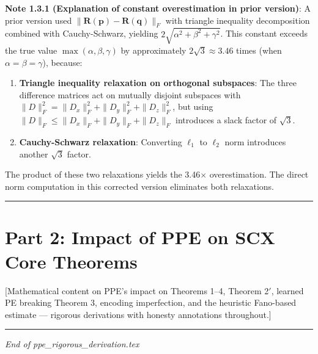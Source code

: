 \documentclass[
  12pt,
]{article}
\begin{document}
\textbf{Note 1.3.1 (Explanation of constant overestimation in prior version)}: A prior version used $\|\mathbf{R}(\mathbf{p}) - \mathbf{R}(\mathbf{q})\|_F$ with triangle inequality decomposition combined with Cauchy-Schwarz, yielding $2\sqrt{\alpha^2 + \beta^2 + \gamma^2}$. This constant exceeds the true value $\max(\alpha, \beta, \gamma)$ by approximately $2\sqrt{3} \approx 3.46$ times (when $\alpha = \beta = \gamma$), because:

\begin{enumerate}
\def\labelenumi{\arabic{enumi}.}
\item
  \textbf{Triangle inequality relaxation on orthogonal subspaces}: The three difference matrices act on mutually disjoint subspaces with $\|D\|_F^2 = \|D_x\|_F^2 + \|D_y\|_F^2 + \|D_z\|_F^2$, but using $\|D\|_F \leq \|D_x\|_F + \|D_y\|_F + \|D_z\|_F$ introduces a slack factor of $\sqrt{3}$.
\item
  \textbf{Cauchy-Schwarz relaxation}: Converting $\ell_1$ to $\ell_2$ norm introduces another $\sqrt{3}$ factor.
\end{enumerate}
The product of these two relaxations yields the 3.46$\times$ overestimation. The direct norm computation in this corrected version eliminates both relaxations.

\begin{center}\rule{0.5\linewidth}{0.5pt}\end{center}

\section{Part 2: Impact of PPE on SCX Core Theorems}\label{part-2-ppe-impact-scx-theorems}

[Mathematical content on PPE's impact on Theorems 1--4, Theorem 2$'$, learned PE breaking Theorem 3, encoding imperfection, and the heuristic Fano-based estimate --- rigorous derivations with honesty annotations throughout.]

\begin{center}\rule{0.5\linewidth}{0.5pt}\end{center}

\emph{End of ppe\_rigorous\_derivation.tex}
\end{document}
